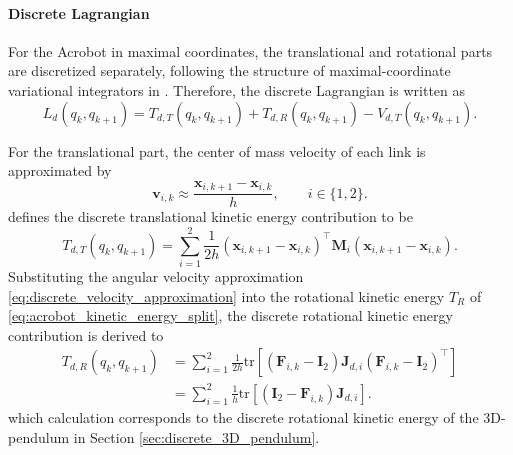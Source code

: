 \paragraph{Discrete Lagrangian}

For the Acrobot in maximal coordinates, the translational and rotational parts are
discretized separately, following the structure of maximal-coordinate variational
integrators in \cite{BrudigamManchester2021VariationalIntegrators}. Therefore,
the discrete Lagrangian is written as
\begin{equation}
    L_d(q_k,q_{k+1})
    =
    T_{d,T}(q_k,q_{k+1})
    +
    T_{d,R}(q_k,q_{k+1})
    -
    V_{d,T}(q_k,q_{k+1}).
    \label{eq:acrobot_discrete_lagrangian_split}
\end{equation}

For the translational part, the center of mass velocity of each link is approximated
by
\begin{equation}
    \bm{v}_{i,k}
    \approx
    \frac{\bm{x}_{i,k+1}-\bm{x}_{i,k}}{h},
    \qquad i\in\{1,2\}.
    \label{eq:acrobot_discrete_translational_velocity}
\end{equation}
\cite{BrudigamManchester2021VariationalIntegrators} defines the discrete translational kinetic energy contribution to be
\begin{equation}
    T_{d,T}(q_k,q_{k+1})
    =
    \sum_{i=1}^{2}
    \frac{1}{2h}
    \left(
    \bm{x}_{i,k+1}-\bm{x}_{i,k}
    \right)^{\top}
    \bm{M}_i
    \left(
    \bm{x}_{i,k+1}-\bm{x}_{i,k}
    \right).
    \label{eq:acrobot_discrete_translational_lagrangian}
\end{equation}
Substituting the angular velocity approximation \eqref{eq:discrete_velocity_approximation} into the rotational kinetic energy
$T_R$ of \eqref{eq:acrobot_kinetic_energy_split}, the discrete rotational kinetic
energy contribution is derived to
\begin{equation}
\begin{aligned}
    T_{d,R}(q_k,q_{k+1})
    &=
    \sum_{i=1}^{2}
    \frac{1}{2h}
    \mathrm{tr}
    \left[
    \left(
    \bm{F}_{i,k}-\bm{I}_{2}
    \right)
    \bm{J}_{d,i}
    \left(
    \bm{F}_{i,k}-\bm{I}_{2}
    \right)^{\top}
    \right] \\
    &=
    \sum_{i=1}^{2}
    \frac{1}{h}
    \mathrm{tr}
    \left[
    \left(
    \bm{I}_{2}
    -
    \bm{F}_{i,k}
    \right)
    \bm{J}_{d,i}
    \right].
\end{aligned}
\label{eq:acrobot_discrete_rotational_lagrangian}
\end{equation}
which calculation corresponds to the discrete rotational kinetic energy of the 3D-pendulum in Section \ref{sec:discrete_3D_pendulum}.

